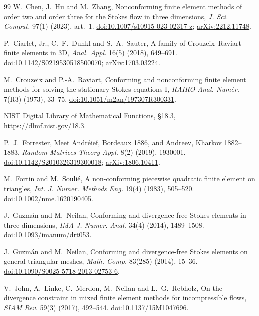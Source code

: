 \documentclass[11pt,a4paper]{article}
\theoremstyle{definition}
\theoremstyle{remark}
\begin{document}
\begin{thebibliography}{99}
 W.~Chen, J.~Hu and M.~Zhang, Nonconforming finite element methods
of order two and order three for the Stokes flow in three dimensions, \emph{J. Sci.
Comput.} 97(1) (2023), art.~1.
\href{https://doi.org/10.1007/s10915-023-02317-z}{doi:10.1007/s10915-023-02317-z};
\href{https://arxiv.org/abs/2212.11748}{arXiv:2212.11748}.

 P.~Ciarlet, Jr., C.~F.~Dunkl and S.~A.~Sauter, A family of
Crouzeix--Raviart finite elements in 3D, \emph{Anal. Appl.} 16(5) (2018), 649--691.
\href{https://doi.org/10.1142/S0219530518500070}{doi:10.1142/S0219530518500070};
\href{https://arxiv.org/abs/1703.03224}{arXiv:1703.03224}.

 M.~Crouzeix and P.-A.~Raviart, Conforming and nonconforming finite
element methods for solving the stationary Stokes equations I, \emph{RAIRO Anal.
Numér.} 7(R3) (1973), 33--75.
\href{https://doi.org/10.1051/m2an/197307R300331}{doi:10.1051/m2an/197307R300331}.

 NIST Digital Library of Mathematical Functions, \S18.3,
\url{https://dlmf.nist.gov/18.3}.

 P.~J.~Forrester, Meet Andréief, Bordeaux 1886, and Andreev,
Kharkov 1882--1883, \emph{Random Matrices Theory Appl.} 8(2) (2019), 1930001.
\href{https://doi.org/10.1142/S2010326319300018}{doi:10.1142/S2010326319300018};
\href{https://arxiv.org/abs/1806.10411}{arXiv:1806.10411}.

 M.~Fortin and M.~Soulié, A non-conforming piecewise quadratic
finite element on triangles, \emph{Int. J. Numer. Methods Eng.} 19(4) (1983),
505--520. \href{https://doi.org/10.1002/nme.1620190405}{doi:10.1002/nme.1620190405}.

 J.~Guzmán and M.~Neilan, Conforming and divergence-free Stokes
elements in three dimensions, \emph{IMA J. Numer. Anal.} 34(4) (2014), 1489--1508.
\href{https://doi.org/10.1093/imanum/drt053}{doi:10.1093/imanum/drt053}.

 J.~Guzmán and M.~Neilan, Conforming and divergence-free Stokes
elements on general triangular meshes, \emph{Math. Comp.} 83(285) (2014), 15--36.
\href{https://doi.org/10.1090/S0025-5718-2013-02753-6}{doi:10.1090/S0025-5718-2013-02753-6}.

 V.~John, A.~Linke, C.~Merdon, M.~Neilan and L.~G.~Rebholz, On
the divergence constraint in mixed finite element methods for incompressible flows,
\emph{SIAM Rev.} 59(3) (2017), 492--544.
\href{https://doi.org/10.1137/15M1047696}{doi:10.1137/15M1047696}.


\end{thebibliography}
\end{document}
